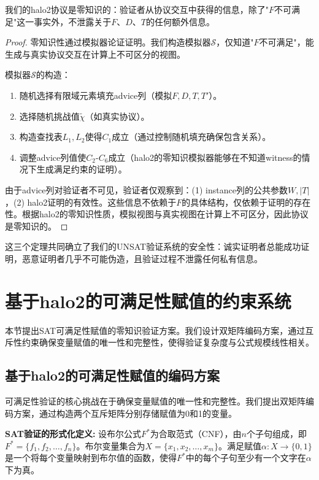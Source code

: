 \begin{theorem}[UNSAT验证的零知识性]
我们的halo2协议是零知识的：验证者从协议交互中获得的信息，除了"$F$不可满足"这一事实外，不泄露关于$F$、$D$、$T$的任何额外信息。
\end{theorem}

\begin{proof}
零知识性通过模拟器论证证明。我们构造模拟器$\mathcal{S}$，仅知道"$F$不可满足"，能生成与真实协议交互在计算上不可区分的视图。

模拟器$\mathcal{S}$的构造：
\begin{enumerate}
    \item 随机选择有限域元素填充advice列（模拟$F, D, T, T'$）。
    \item 选择随机挑战值$\tilde{\chi}$（如真实协议）。
    \item 构造查找表$L_1, L_2$使得$C_1$成立（通过控制随机填充确保包含关系）。
    \item 调整advice列值使$C_2$-$C_6$成立（halo2的零知识模拟器能够在不知道witness的情况下生成满足约束的证明）。
\end{enumerate}

由于advice列对验证者不可见，验证者仅观察到：(1) instance列的公共参数$W, |T|$，(2) halo2证明的有效性。这些信息不依赖于$F$的具体结构，仅依赖于证明的存在性。根据halo2的零知识性质，模拟视图与真实视图在计算上不可区分，因此协议是零知识的。
\end{proof}

这三个定理共同确立了我们的UNSAT验证系统的安全性：诚实证明者总能成功证明，恶意证明者几乎不可能伪造，且验证过程不泄露任何私有信息。

\section{基于halo2的可满足性赋值的约束系统}

本节提出SAT可满足性赋值的零知识验证方案。我们设计双矩阵编码方案，通过互斥性约束确保变量赋值的唯一性和完整性，使得验证复杂度与公式规模线性相关。

\subsection{基于halo2的可满足性赋值的编码方案}\label{sec:sat-encoding-scheme}
可满足性验证的核心挑战在于确保变量赋值的唯一性和完整性。我们提出双矩阵编码方案，通过构造两个互斥矩阵分别存储赋值为0和1的变量。

\textbf{SAT验证的形式化定义:}
设布尔公式$F^*$为合取范式（CNF），由$n$个子句组成，即$F^* = \{f_1, f_2, \ldots, f_n\}$。布尔变量集合为$X = \{x_1, x_2, \ldots, x_m\}$。满足赋值$\alpha: X \rightarrow \{0, 1\}$是一个将每个变量映射到布尔值的函数，使得$F^*$中的每个子句至少有一个文字在$\alpha$下为真。

